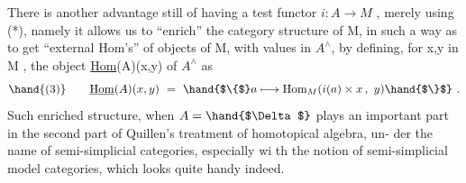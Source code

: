 There  is another advantage still of having a test functor
$i : A \longrightarrow M$ ,   merely using (*),  namely it allows us to
``enrich''  the category structure of M,  in such a way as to get
``external Hom's''  of objects of M,  with values in $A^{\wedge}$,  by defining,
for  x,y  in M ,  the object  \uline{Hom}(A)(x,y)  of $A^{\wedge}$ as
\[ \hand{(3)} \qquad \underline{\mathrm{Hom}}(A)(x,y) \ = \ \hand{$\{$} a \longmapsto \mathrm{Hom}_{M}(i(a) \times x \, , \ y) \hand{$\}$} \ . \]
 Such enriched structure,  when  $A = \hand{$\Delta$}$\hand{\unsure{,}}  plays an important part
in the second part of Quillen's treatment of homotopical algebra,  un-%
der the name of \hand{(}semi-\hand{)}simplicial categories,  especially wi th the notion
of \hand{(}semi-\hand{)}simplicial model categories,  which looks quite handy indeed.

